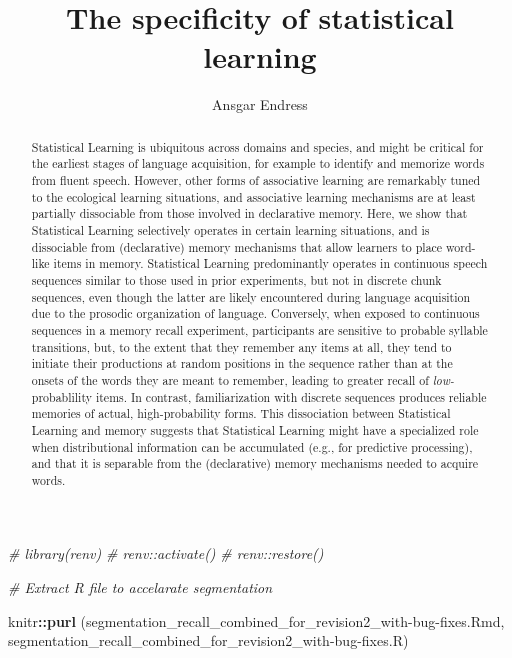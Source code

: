 \documentclass[
]{article}
\title{The specificity of statistical learning}
\author{Ansgar Endress}
\date{}
\newenvironment{Shaded}{\begin{snugshade}}{\end{snugshade}}
\newcommand{\CommentTok}[1]{\textcolor[rgb]{0.56,0.35,0.01}{\textit{#1}}}
\newcommand{\FunctionTok}[1]{\textcolor[rgb]{0.13,0.29,0.53}{\textbf{#1}}}
\newcommand{\NormalTok}[1]{#1}
\newcommand{\SpecialCharTok}[1]{\textcolor[rgb]{0.81,0.36,0.00}{\textbf{#1}}}
\newcommand{\StringTok}[1]{\textcolor[rgb]{0.31,0.60,0.02}{#1}}
\begin{document}
\maketitle
\begin{abstract}
Statistical Learning is ubiquitous across domains and species, and might
be critical for the earliest stages of language acquisition, for example
to identify and memorize words from fluent speech. However, other forms
of associative learning are remarkably tuned to the ecological learning
situations, and associative learning mechanisms are at least partially
dissociable from those involved in declarative memory. Here, we show
that Statistical Learning selectively operates in certain learning
situations, and is dissociable from (declarative) memory mechanisms that
allow learners to place word-like items in memory. Statistical Learning
predominantly operates in continuous speech sequences similar to those
used in prior experiments, but not in discrete chunk sequences, even
though the latter are likely encountered during language acquisition due
to the prosodic organization of language. Conversely, when exposed to
continuous sequences in a memory recall experiment, participants are
sensitive to probable syllable transitions, but, to the extent that they
remember any items at all, they tend to initiate their productions at
random positions in the sequence rather than at the onsets of the words
they are meant to remember, leading to greater recall of
\emph{low-}probablility items. In contrast, familiarization with
discrete sequences produces reliable memories of actual,
high-probability forms. This dissociation between Statistical Learning
and memory suggests that Statistical Learning might have a specialized
role when distributional information can be accumulated (e.g., for
predictive processing), and that it is separable from the (declarative)
memory mechanisms needed to acquire words.
\end{abstract}

{
\setcounter{tocdepth}{5}
\tableofcontents
}
\begin{Shaded}
\begin{Highlighting}[]
\CommentTok{\# library(renv)}
\CommentTok{\# renv::activate()}
\CommentTok{\# renv::restore()}
\end{Highlighting}
\end{Shaded}

\begin{Shaded}
\begin{Highlighting}[]
\CommentTok{\# Extract R file to accelarate segmentation}

\NormalTok{knitr}\SpecialCharTok{::}\FunctionTok{purl}\NormalTok{ (}\StringTok{\textquotesingle{}segmentation\_recall\_combined\_for\_revision2\_with{-}bug{-}fixes.Rmd\textquotesingle{}}\NormalTok{, }
      \StringTok{\textquotesingle{}segmentation\_recall\_combined\_for\_revision2\_with{-}bug{-}fixes.R\textquotesingle{}}\NormalTok{)}
\end{Highlighting}
\end{Shaded}
\end{document}
